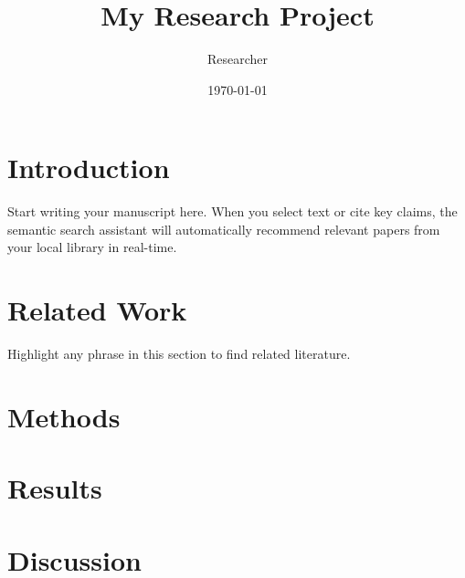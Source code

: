 \documentclass{article}
\title{My Research Project}
\author{Researcher}
\date{\today}
\begin{document}
\maketitle

\section{Introduction}
Start writing your manuscript here. When you select text or cite key claims, the semantic search assistant will automatically recommend relevant papers from your local library in real-time.

\section{Related Work}
Highlight any phrase in this section to find related literature.

\section{Methods}

\section{Results}

\section{Discussion}



\end{document}
